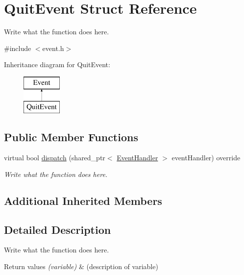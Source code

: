 \hypertarget{structQuitEvent}{\section{Quit\+Event Struct Reference}
\label{structQuitEvent}
}


Write what the function does here.  




{\ttfamily \#include $<$event.\+h$>$}

Inheritance diagram for Quit\+Event\+:\begin{figure}[H]
\begin{center}
\leavevmode
\includegraphics[height=2.000000cm]{structQuitEvent}
\end{center}
\end{figure}
\subsection*{Public Member Functions}
\begin{DoxyCompactItemize}
\item 
virtual bool \hyperlink{structQuitEvent_ac008fb404abe76e5a79741b61e59c37c}{dispatch} (shared\+\_\+ptr$<$ \hyperlink{structEventHandler}{Event\+Handler} $>$ event\+Handler) override
\begin{DoxyCompactList}\small\item\em Write what the function does here. \end{DoxyCompactList}\end{DoxyCompactItemize}
\subsection*{Additional Inherited Members}


\subsection{Detailed Description}
Write what the function does here. 


\begin{DoxyRetVals}{Return values}
{\em (variable)} & (description of variable) \\
\hline
\end{DoxyRetVals}



